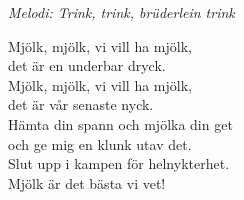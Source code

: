 {\footnotesize\textit{Melodi: Trink, trink, brüderlein trink}}\par
\vspace{10pt}
\revrpt Mjölk, mjölk, vi vill ha mjölk,\\
det är en underbar dryck.\\
Mjölk, mjölk, vi vill ha mjölk,\\
det är vår senaste nyck.\\
Hämta din spann och mjölka din get\\
och ge mig en klunk utav det.\\
Slut upp i kampen för helnykterhet.\\
Mjölk är det bästa vi vet!\rpt
